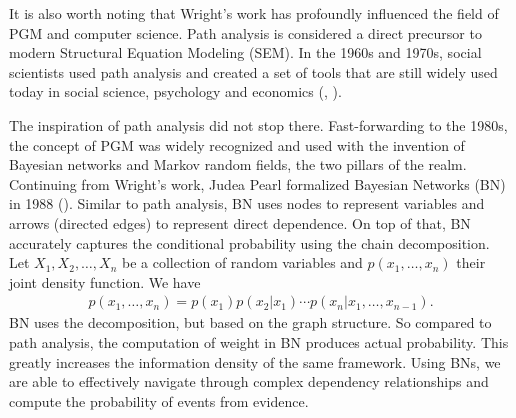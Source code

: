 It is also worth noting that Wright's work has profoundly influenced the
field of PGM and computer science. Path analysis is considered a direct
precursor to modern Structural Equation Modeling (SEM). In the 1960s and 1970s,
social scientists used path analysis and created a set of tools that are still
widely used today in social science, psychology and economics
(\cite{Duncan1975}, \cite{Bollen89}).

The inspiration of path analysis did not stop there. Fast-forwarding to the
1980s, the concept of PGM was widely recognized and used with the invention of
Bayesian networks and Markov random fields, the two pillars of the realm.
Continuing from Wright's work, Judea Pearl formalized Bayesian Networks (BN) in
1988 (\cite{10.5555/534975}). Similar to path analysis, BN uses nodes to
represent variables and arrows (directed edges) to represent direct dependence.
On top of that, BN accurately captures the conditional probability using the
chain decomposition. Let $X_1, X_2, \ldots, X_n$ be a collection of random
variables and $p(x_1,\dots, x_n)$ their joint density function. We have
\begin{align}
    p(x_1,\dots, x_n) = p(x_1)p(x_2|x_1)\cdots p(x_n|x_1,\dots,x_{n-1}).
\end{align}
BN uses the decomposition, but based on the graph structure. So compared to path analysis, the computation of weight in BN produces actual probability. This greatly increases the information density of the same framework. Using BNs, we are able to effectively navigate through complex dependency relationships and compute the probability of events from evidence.

